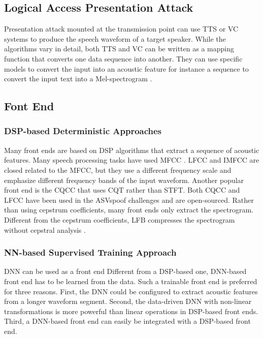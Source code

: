 \subsection{Logical Access Presentation Attack}

Presentation attack mounted at the transmission point can use \ac{TTS} or \ac{VC} systems to produce the speech waveform of a target speaker. While the algorithms vary in detail, both \acs{TTS} and \acs{VC} can be written as a mapping function that converts one data sequence into another\cite{wang2022practical}. They can use specific models to convert the input into an acoustic feature for instance a sequence to convert the input text into a Mel-spectrogram \cite{shen2018natural}.

\subsection{Font End}

\subsubsection{DSP-based Deterministic Approaches}

Many front ends are based on \ac{DSP} algorithms that extract a sequence of acoustic features. Many speech processing tasks have used \ac{MFCC} \cite{davis1980comparison}. \ac{LFCC} \cite{davis1980comparison} and \ac{IMFCC} are closed related to the MFCC, but they use a different frequency scale and emphasize different frequency bands of the input waveform. Another popular front end is the \ac{CQCC} that uses \ac{CQT} rather than \ac{STFT}. Both \acs{CQCC} and \acs{LFCC} have been used in the ASVspoof challenges and are open-sourced. Rather than using cepstrum coefficients, many front ends only extract the spectrogram. Different from the cepstrum coefficients, \ac{LFB} compresses the spectrogram without cepstral analysis \cite{wang2022practical}.

\subsubsection{NN-based Supervised Training Approach}

\ac{DNN} can be used as a front end Different from a DSP-based one,  DNN-based front end has to be learned from the data. Such a trainable front end is preferred for three reasons. First, the DNN could be configured to extract acoustic features from a longer waveform segment. Second, the data-driven DNN with non-linear transformations is more powerful than linear operations in DSP-based front ends. Third, a DNN-based front end can easily be integrated with a DSP-based front end\cite{wang2022practical}. 

